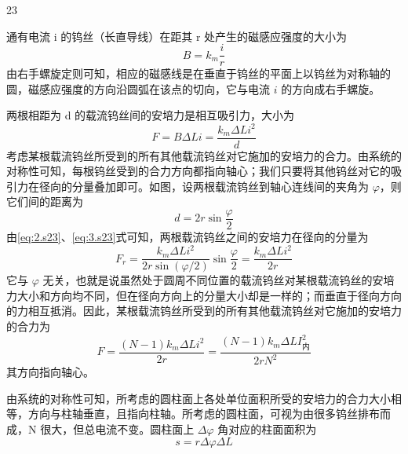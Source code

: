 \begin{solution}{23}
    \begin{subsolution}
        通有电流 i 的钨丝（长直导线）在距其 r 处产生的磁感应强度的大小为
        \begin{equation}
            B = k_m \frac{i}{r}
            \label{eq:1.s23}
        \end{equation}
        由右手螺旋定则可知，相应的磁感线是在垂直于钨丝的平面上以钨丝为对称轴的圆，磁感应强度的方向沿圆弧在该点的切向，它与电流 $i$ 的方向成右手螺旋。

        两根相距为 d 的载流钨丝间的安培力是相互吸引力，大小为
        \begin{equation}
            F = B \Delta L i = \frac{k_m \Delta L i^2}{d}
            \label{eq:2.s23}
        \end{equation}
        考虑某根载流钨丝所受到的所有其他载流钨丝对它施加的安培力的合力。由系统的对称性可知，每根钨丝受到的合力方向都指向轴心；我们只要将其他钨丝对它的吸引力在径向的分量叠加即可。如图，设两根载流钨丝到轴心连线间的夹角为 $\varphi$，则它们间的距离为
        \begin{equation}
            d = 2r\sin\frac{\varphi}{2}
            \label{eq:3.s23}
        \end{equation}
        由\eqref{eq:2.s23}、\eqref{eq:3.s23}式可知，两根载流钨丝之间的安培力在径向的分量为
        \begin{equation}
            F_r = \frac{k_m \Delta L i^2}{2r\sin(\varphi/2)}\sin\frac{\varphi}{2} = \frac{k_m \Delta L i^2}{2r}
            \label{eq:4.s23}
        \end{equation}
        它与 $\varphi$ 无关，也就是说虽然处于圆周不同位置的载流钨丝对某根载流钨丝的安培力大小和方向均不同，但在径向方向上的分量大小却是一样的；而垂直于径向方向的力相互抵消。因此，某根载流钨丝所受到的所有其他载流钨丝对它施加的安培力的合力为
        \begin{equation}
            F = \frac{(N-1)k_m \Delta L i^2}{2r} = \frac{(N-1)k_m \Delta L I_{\text{内}}^2}{2r N^2}
            \label{eq:5.s23}
        \end{equation}
        其方向指向轴心。
    \end{subsolution}
    \begin{subsolution}
        由系统的对称性可知，所考虑的圆柱面上各处单位面积所受的安培力的合力大小相等，方向与柱轴垂直，且指向柱轴。所考虑的圆柱面，可视为由很多钨丝排布而成，N 很大，但总电流不变。圆柱面上 $\Delta\varphi$ 角对应的柱面面积为
        \begin{equation}
            s = r \Delta\varphi \Delta L

\end{equation}
\end{subsolution}
\end{solution}
